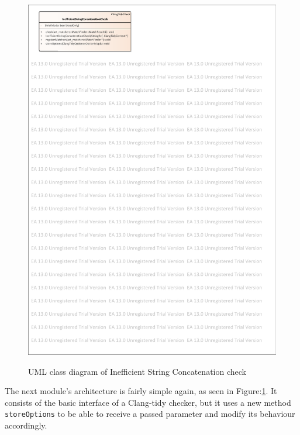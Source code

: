 \begin{figure}[H]
	\caption{UML class diagram of Inefficient String Concatenation check}
	\centering
	\includegraphics[scale=1.8]{images/InefficientStringConcatenation.pdf}
	\label{string_concat_check}
\end{figure}
\par The next module's architecture is fairly simple again, as seen in Figure:\ref{string_concat_check}. It consists of the basic interface of a Clang-tidy checker, but it uses a new method \verb|storeOptions| to be able to receive a passed parameter and modify its behaviour accordingly.
